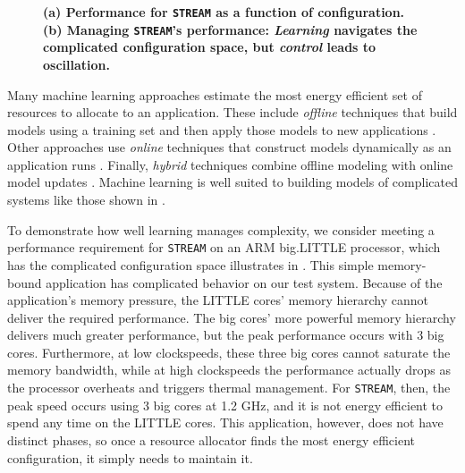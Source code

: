 \begin{figure}
\centering
  \subfloat[]
  {
    
    \label{fig:STREAM_timeline}
  }
  \caption{\small \bf (a) Performance for \texttt{STREAM} as a
    function of configuration.  (b) Managing \texttt{STREAM}'s
    performance: \emph{Learning} navigates the complicated
    configuration space, but \emph{control} leads to oscillation.}
  \label{fig:learning-models1}
\end{figure}

Many machine learning approaches estimate the most energy efficient
set of resources to allocate to an application.  These include
\emph{offline} techniques that build models using a training set and
then apply those models to new applications
\cite{Yi2003,LeeBrooks2006,CPR,ChenJohn2011,reddiHPCA2013,Paragon}.
Other approaches use \emph{online} techniques that construct models
dynamically as an application runs
\cite{Li2006,Flicker,ParallelismDial,Ponamarev,LeeBrooks}.  Finally,
\emph{hybrid} techniques combine offline modeling with online model
updates \cite{Zhang2012,packandcap,Winter2010,dubach2010,Koala,Cinder,
  wu2012inferred}.  Machine learning is well suited to building models
of complicated systems like those shown in
.

To demonstrate how well learning manages complexity, we consider
meeting a performance requirement for \texttt{STREAM} on an ARM
big.LITTLE processor, which has the complicated configuration space
illustrates in .  This simple memory-bound
application has complicated behavior on our test system.  Because of
the application's memory pressure, the LITTLE cores' memory hierarchy
cannot deliver the required performance.  The big cores' more powerful
memory hierarchy delivers much greater performance, but the peak
performance occurs with 3 big cores.  Furthermore, at low clockspeeds,
these three big cores cannot saturate the memory bandwidth, while at
high clockspeeds the performance actually drops as the processor
overheats and triggers thermal management.  For \texttt{STREAM}, then,
the peak speed occurs using 3 big cores at 1.2 GHz, and it is not
energy efficient to spend any time on the LITTLE cores.  This
application, however, does not have distinct phases, so once a
resource allocator finds the most energy efficient configuration, it
simply needs to maintain it.


